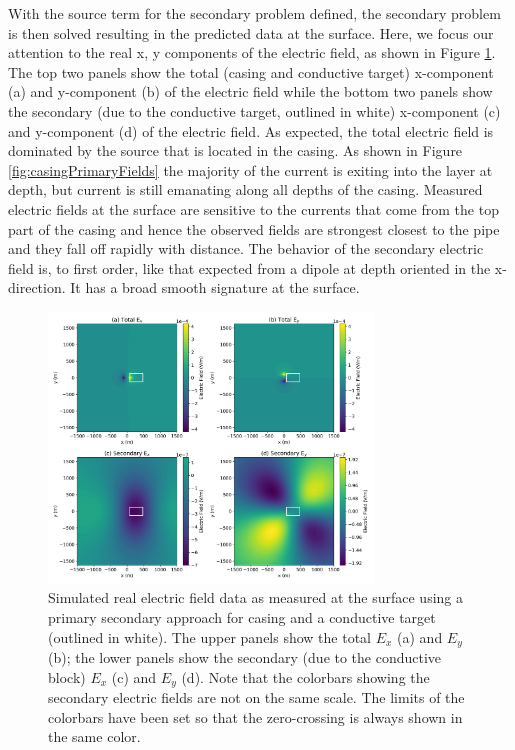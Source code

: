 \documentclass[preprint,review,3p,times,onecolumn,authoryear]{elsarticle}
\begin{document}
With the source term for the secondary problem defined, the secondary problem
is then solved resulting in the predicted data at the surface. Here, we focus
our attention to the real x, y components of the electric field, as shown in
Figure \ref{fig:casingData}. The top two panels show the total (casing and
conductive target) x-component (a) and y-component (b)  of the electric field
while the bottom two panels show the secondary (due to the conductive target,
outlined in white) x-component (c) and y-component (d) of the electric field.
As expected, the total electric field is dominated by the source that is
located in the casing. As shown in Figure \ref{fig:casingPrimaryFields} the
majority of the current is exiting into the layer at depth, but current is
still emanating along all depths of the casing. Measured electric fields at
the surface are sensitive to the currents that come from the top part of the
casing and hence the observed fields are strongest closest to the pipe and
they fall off rapidly with distance. The behavior of the secondary electric
field is, to first order, like that expected from a dipole at depth oriented
in the x-direction. It has a broad smooth signature at the surface.

{%
\begin{figure}[htb!]
    \centering
    \includegraphics[width=0.77\textwidth]{images/casingDpred.png}
\caption{Simulated real electric field data as measured at the surface using a
         primary secondary approach for casing and a conductive target (outlined
         in white). The upper panels show the total $E_x$ (a) and $E_y$ (b); the
         lower panels show the secondary (due to the conductive block) $E_x$ (c)
         and $E_y$ (d). Note that the colorbars showing the secondary electric
         fields are not on the same scale. The limits of the colorbars have been set
         so that the zero-crossing is always shown in the same color.}
\label{fig:casingData}
\end{figure}
}
\end{document}
